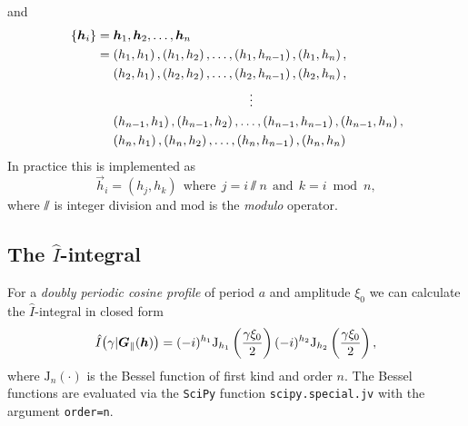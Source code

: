 and
\begin{align*}
    &\cbr{\vec h_i} = \vec h_1, \vec h_2, \dots, \vec h_n \\
    &\phantom{\cbr{\vec h_i}{}} = \del{h_1, h_1}, \del{h_1, h_2}, \dots, \del{h_1, h_{n-1}}, \del{h_1, h_n}, \\
    &\phantom{\cbr{\vec h_i} = {}} \del{h_2, h_1}, \del{h_2, h_2}, \dots, \del{h_2, h_{n-1}}, \del{h_2, h_n}, \\
    &\hspace{5cm} \vdots \\
    &\phantom{\cbr{\vec h_i} = {}} \del{h_{n-1}, h_1}, \del{h_{n-1}, h_2}, \dots, \del{h_{n-1}, h_{n-1}}, \del{h_{n-1}, h_n}, \\
    &\phantom{\cbr{\vec h_i} = {}} \del{h_n, h_1}, \del{h_n, h_2}, \dots, \del{h_n, h_{n-1}}, \del{h_n, h_n} \\
\end{align*}
In practice this is implemented as
\begin{equation}
    \vec h_ i = (h_j, h_k) ~~\text{where}~~ j = i \sslash n ~~\text{and}~~ k = i \bmod n,
\end{equation}
where $\sslash$ is integer division and $\mathrm{mod}$ is the \emph{modulo} operator.

\subsection*{The $\hat I$-integral}
For a \emph{doubly periodic cosine profile} of period $a$ and amplitude $\xi_0$ we can calculate the $\hat I$-integral in closed form
\begin{equation}
    \hat I\del[1]{\gamma\vert \vec G_\|(\vec h)} = (-i)^{h_1} \mathrm{J}_{h_1}\del{\frac{\gamma\xi_0}{2}} (-i)^{h_2} \mathrm{J}_{h_2}\del{\frac{\gamma\xi_0}{2}},
\end{equation}
where $\mathrm{J}_n(\cdot)$ is the Bessel function of first kind and order $n$. The Bessel functions are evaluated via the \texttt{SciPy} function \texttt{scipy.special.jv} with the argument \texttt{order=n}.